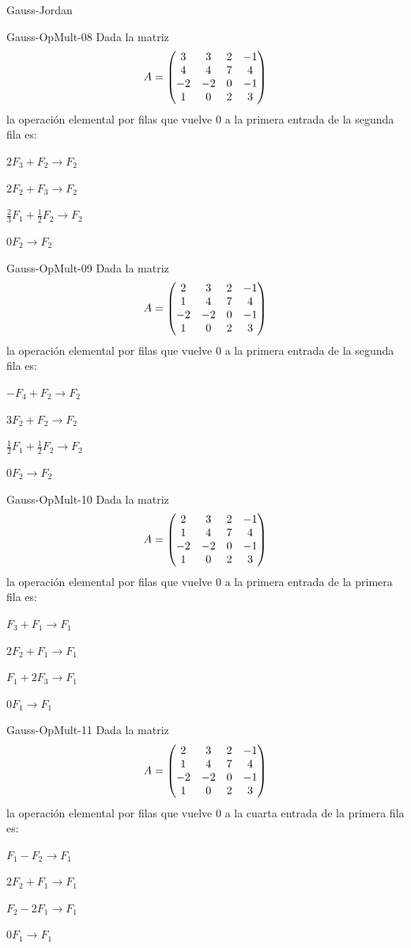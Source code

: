 \documentclass[a4,11pt]{aleph-notas}
\begin{document}
\begin{quiz}{Gauss-Jordan}
\begin{multi}{Gauss-OpMult-08}
    Dada la matriz
    \[
        A= \begin{pmatrix} 3 & 3 & 2 & -1 \cr 4 & 4 & 7 & 4  \cr -2 & -2 & 0 & -1 \cr 1 & 0 & 2 & 3\end{pmatrix} 
    \] la operación elemental por filas que vuelve $0$ a la primera entrada de la segunda fila es:
    \item* $2F_3+F_2\to F_2$
    \item $2F_2+F_3\to F_2$
    \item $\frac{2}{3}F_1+\frac{1}{2}F_2\to F_2$
    \item $0F_2\to F_2$
\end{multi}

\begin{multi}{Gauss-OpMult-09}
    Dada la matriz
    \[
        A= \begin{pmatrix} 2 & 3 & 2 & -1 \cr 1 & 4 & 7 & 4  \cr -2 & -2 & 0 & -1 \cr 1 & 0 & 2 & 3\end{pmatrix} 
    \] la operación elemental por filas que vuelve $0$ a la primera entrada de la segunda fila es:
    \item* $-F_4+F_2\to F_2$
    \item $3F_2+F_2\to F_2$
    \item $\frac{1}{2}F_1+\frac{1}{2}F_2\to F_2$
    \item $0F_2\to F_2$
\end{multi}

\begin{multi}{Gauss-OpMult-10}
    Dada la matriz
    \[
        A= \begin{pmatrix} 2 & 3 & 2 & -1 \cr 1 & 4 & 7 & 4  \cr -2 & -2 & 0 & -1 \cr 1 & 0 & 2 & 3\end{pmatrix} 
    \] la operación elemental por filas que vuelve $0$ a la primera entrada de la primera fila es:
    \item* $F_3+F_1\to F_1$
    \item $2F_2+F_1\to F_1$
    \item $F_1+2F_3\to F_1$
    \item $0F_1\to F_1$
\end{multi}

\begin{multi}{Gauss-OpMult-11}
    Dada la matriz
    \[
        A= \begin{pmatrix} 2 & 3 & 2 & -1 \cr 1 & 4 & 7 & 4  \cr -2 & -2 & 0 & -1 \cr 1 & 0 & 2 & 3\end{pmatrix} 
    \] la operación elemental por filas que vuelve $0$ a la cuarta entrada de la primera fila es:
    \item* $F_1-F_2\to F_1$
    \item $2F_2+F_1\to F_1$
    \item $F_2-2F_1\to F_1$
    \item $0F_1\to F_1$
\end{multi}


\end{quiz}
\end{document}

